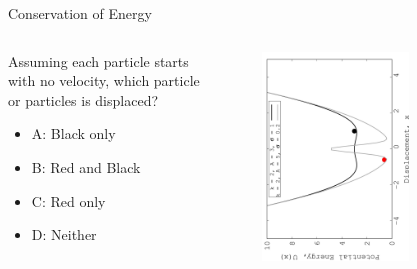 \documentclass{beamer}
\begin{document}
\begin{frame}{Conservation of Energy}
\begin{columns}[T]
\begin{column}{0.3\textwidth}
\small
Assuming each particle starts with no velocity, which particle or particles is displaced?
\begin{itemize}
\item A: Black only
\item B: Red and Black
\item C: Red only
\item D: Neither
\end{itemize}
\end{column}
\begin{column}{0.7\textwidth}
\begin{figure}
\centering
\includegraphics[width=0.7\textwidth,angle=270]{figures/Nov14_plot3.jpg}
\end{figure}
\end{column}
\end{columns}
\end{frame}
\end{document}
